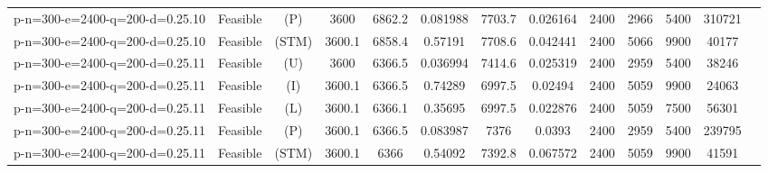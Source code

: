 \documentclass[landscape, a4paper]{article}
\newcommand{\STM}{\ensuremath{\mathrm{STM}}}
\newcommand{\Improved}{\ensuremath{\mathrm{I}}}
\newcommand{\Loose}{\ensuremath{\mathrm{L}}}
\newcommand{\Profit}{\ensuremath{\mathrm{P}}}
\newcommand{\Utility}{\ensuremath{\mathrm{U}}}
\begin{document}
\begin{center}
\begin{tabular}{lcccccccccccc}
p-n=300-e=2400-q=200-d=0.25.10 & Feasible & (\Profit) & 3600 & 6862.2 & 0.081988 & 7703.7 & 0.026164 & 2400 & 2966 & 5400 & 310721 & \\
p-n=300-e=2400-q=200-d=0.25.10 & Feasible & (\STM) & 3600.1 & 6858.4 & 0.57191 & 7708.6 & 0.042441 & 2400 & 5066 & 9900 & 40177 & \\
p-n=300-e=2400-q=200-d=0.25.11 & Feasible & (\Utility) & 3600 & 6366.5 & 0.036994 & 7414.6 & 0.025319 & 2400 & 2959 & 5400 & 38246 & \\
p-n=300-e=2400-q=200-d=0.25.11 & Feasible & (\Improved) & 3600.1 & 6366.5 & 0.74289 & 6997.5 & 0.02494 & 2400 & 5059 & 9900 & 24063 & \\
p-n=300-e=2400-q=200-d=0.25.11 & Feasible & (\Loose) & 3600.1 & 6366.1 & 0.35695 & 6997.5 & 0.022876 & 2400 & 5059 & 7500 & 56301 & \\
p-n=300-e=2400-q=200-d=0.25.11 & Feasible & (\Profit) & 3600.1 & 6366.5 & 0.083987 & 7376 & 0.0393 & 2400 & 2959 & 5400 & 239795 & \\
p-n=300-e=2400-q=200-d=0.25.11 & Feasible & (\STM) & 3600.1 & 6366 & 0.54092 & 7392.8 & 0.067572 & 2400 & 5059 & 9900 & 41591 & \\
\end{tabular}
\end{center}
\end{document}
